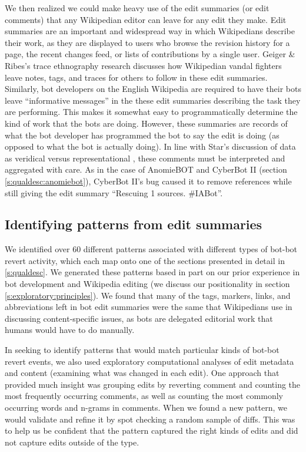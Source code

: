 \documentclass[format=acmsmall, review=false, screen=true]{acmart}%
\begin{document}
We then realized we could make heavy use of the edit summaries (or edit comments) that any Wikipedian editor can leave for any edit they make. Edit summaries are an important and widespread way in which Wikipedians describe their work, as they are displayed to users who browse the revision history for a page, the recent changes feed, or lists of contributions by a single user. Geiger \& Ribes's trace ethnography research \cite{Geiger2010, Geiger2011} discusses how Wikipedian vandal fighters leave notes, tags, and traces for others to follow in these edit summaries. Similarly, bot developers on the English Wikipedia are required to have their bots leave ``informative messages'' in the these edit summaries describing the task they are performing. This makes it somewhat easy to programmatically determine the kind of work that the bots are doing. However, these summaries are records of what the bot developer has programmed the bot to say the edit is doing (as opposed to what the bot is actually doing). In line with Star's discussion of data as veridical versus representational \cite{star1999}, these comments must be interpreted and aggregated with care. As in the case of AnomieBOT and CyberBot II (section \ref{s:qualdesc:anomiebot}), CyberBot II's bug caused it to remove references while still giving the edit summary ``Rescuing 1 sources. \#IABot''.

\subsection{Identifying patterns from edit summaries} \label{s:coding:patterns}
We identified over 60 different patterns associated with different types of bot-bot revert activity, which each map onto one of the sections presented in detail in \ref{s:qualdesc}. We generated these patterns based in part on our prior experience in bot development and Wikipedia editing (we discuss our positionality in section \ref{s:exploratory:principles}). We found that many of the tags, markers, links, and abbreviations left in bot edit summaries were the same that Wikipedians use in discussing content-specific issues, as bots are delegated editorial work that humans would have to do manually.

In seeking to identify patterns that would match particular kinds of bot-bot revert events, we also used exploratory computational analyses of edit metadata and content (examining what was changed in each edit). One approach that provided much insight was grouping edits by reverting comment and counting the most frequently occurring comments, as well as counting the most commonly occurring words and n-grams in comments. When we found a new pattern, we would validate and refine it by spot checking a random sample of diffs. This was to help us be confident that the pattern captured the right kinds of edits and did not capture edits outside of the type. 
\end{document}
